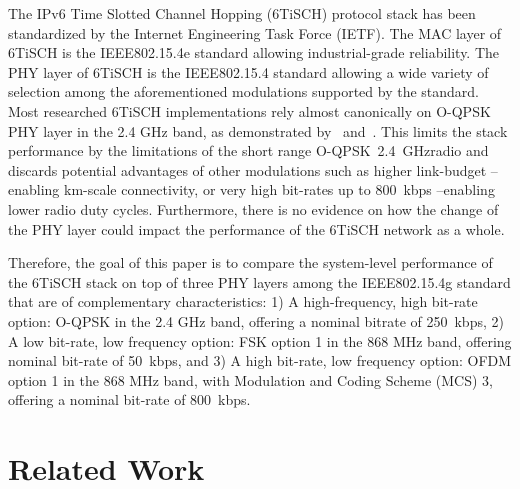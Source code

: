 \documentclass[journal,article,submit,moreauthors,pdftex]{Definitions/mdpi}
\newcommand{\oqpsk}        {O-QPSK~2.4~GHz}
\begin{document}

The IPv6 Time Slotted Channel Hopping (6TiSCH) protocol stack has been  standardized by the Internet Engineering Task Force (IETF).
The MAC layer of 6TiSCH is the IEEE802.15.4e standard allowing industrial-grade reliability.
The PHY layer of 6TiSCH is the IEEE802.15.4 standard allowing a wide variety of selection among the aforementioned modulations supported by the standard.
Most researched 6TiSCH implementations rely almost canonically on O-QPSK PHY layer in the 2.4 GHz band, as demonstrated by~\cite{draft-munoz-6tisch-multi-phy-nodes} and~\cite{brachmann19ieee}.
This limits the stack performance by the limitations of the short range \oqpsk radio and discards potential advantages of other modulations such as higher link-budget --enabling km-scale connectivity, or very high bit-rates up to 800~kbps --enabling lower radio duty cycles.
Furthermore, there is no evidence on how the change of the PHY layer could impact the performance of the 6TiSCH network as a whole. 

Therefore, the goal of this paper is to compare the system-level performance of the 6TiSCH stack on top of three PHY layers among the IEEE802.15.4g standard that are of complementary characteristics: 
     1) A high-frequency, high bit-rate option: O-QPSK in the 2.4 GHz band, offering a nominal bitrate of 250~kbps,
     2) A low bit-rate, low frequency option: FSK option 1 in the 868 MHz band, offering nominal bit-rate of 50~kbps, and 
     3) A high bit-rate, low frequency option: OFDM option 1  in the 868 MHz band, with Modulation and Coding Scheme (MCS) 3, offering a nominal bit-rate of 800~kbps. 

\section{Related Work}
\label{sec:related_work}

\end{document}
